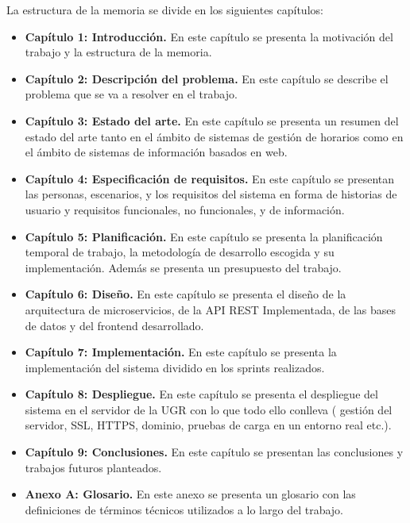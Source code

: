 La estructura de la memoria se divide en los siguientes capítulos:

\begin{itemize}
    \item \textbf{Capítulo 1: Introducción.} En este capítulo se presenta la motivación del trabajo y la estructura de la memoria.
    \item \textbf{Capítulo 2: Descripción del problema.} En este capítulo se describe el problema que se va a resolver en el trabajo.
    \item \textbf{Capítulo 3: Estado del arte.} En este capítulo se presenta un resumen del estado del arte tanto en el ámbito de sistemas de gestión de horarios como en el ámbito de sistemas de información basados en web.
    \item \textbf{Capítulo 4: Especificación de requisitos.} En este capítulo se presentan las personas, escenarios, y los requisitos del sistema en forma de historias de usuario y requisitos funcionales, no funcionales, y de información.
    \item \textbf{Capítulo 5: Planificación.} En este capítulo se presenta la planificación temporal de trabajo, la metodología de desarrollo escogida y su implementación. Además se presenta un presupuesto del trabajo.
    \item \textbf{Capítulo 6: Diseño.} En este capítulo se presenta el diseño de la arquitectura de microservicios, de la API REST Implementada, de las bases de datos y del frontend desarrollado.
    \item \textbf{Capítulo 7: Implementación.} En este capítulo se presenta la implementación del sistema dividido en los sprints realizados.
    \item \textbf{Capítulo 8: Despliegue.} En este capítulo se presenta el despliegue del sistema en el servidor de la UGR con lo que todo ello conlleva ( gestión del servidor, SSL, HTTPS, dominio, pruebas de carga en un entorno real etc.).
    \item \textbf{Capítulo 9: Conclusiones.} En este capítulo se presentan las conclusiones y trabajos futuros planteados.
    \item \textbf{Anexo A: Glosario.} En este anexo se presenta un glosario con las definiciones de términos técnicos utilizados a lo largo del trabajo.
\end{itemize}